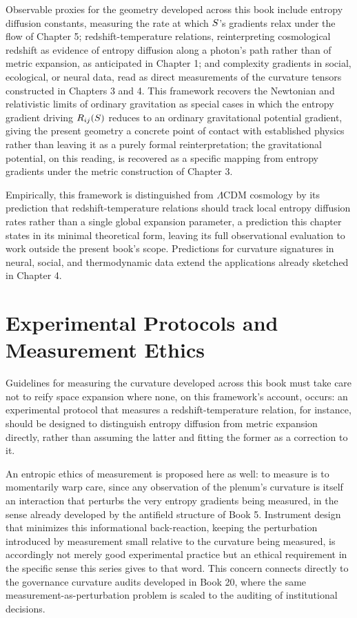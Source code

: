Observable proxies for the geometry developed across this book include entropy diffusion constants, measuring the rate at which $S$'s gradients relax under the flow of Chapter 5; redshift-temperature relations, reinterpreting cosmological redshift as evidence of entropy diffusion along a photon's path rather than of metric expansion, as anticipated in Chapter 1; and complexity gradients in social, ecological, or neural data, read as direct measurements of the curvature tensors constructed in Chapters 3 and 4. This framework recovers the Newtonian and relativistic limits of ordinary gravitation as special cases in which the entropy gradient driving $R_{ij}(S)$ reduces to an ordinary gravitational potential gradient, giving the present geometry a concrete point of contact with established physics rather than leaving it as a purely formal reinterpretation; the gravitational potential, on this reading, is recovered as a specific mapping from entropy gradients under the metric construction of Chapter 3.

Empirically, this framework is distinguished from $\Lambda$CDM cosmology by its prediction that redshift-temperature relations should track local entropy diffusion rates rather than a single global expansion parameter, a prediction this chapter states in its minimal theoretical form, leaving its full observational evaluation to work outside the present book's scope. Predictions for curvature signatures in neural, social, and thermodynamic data extend the applications already sketched in Chapter 4.

\chapter{Experimental Protocols and Measurement Ethics}

Guidelines for measuring the curvature developed across this book must take care not to reify space expansion where none, on this framework's account, occurs: an experimental protocol that measures a redshift-temperature relation, for instance, should be designed to distinguish entropy diffusion from metric expansion directly, rather than assuming the latter and fitting the former as a correction to it.

An entropic ethics of measurement is proposed here as well: to measure is to momentarily warp care, since any observation of the plenum's curvature is itself an interaction that perturbs the very entropy gradients being measured, in the sense already developed by the antifield structure of Book 5. Instrument design that minimizes this informational back-reaction, keeping the perturbation introduced by measurement small relative to the curvature being measured, is accordingly not merely good experimental practice but an ethical requirement in the specific sense this series gives to that word. This concern connects directly to the governance curvature audits developed in Book 20, where the same measurement-as-perturbation problem is scaled to the auditing of institutional decisions.

